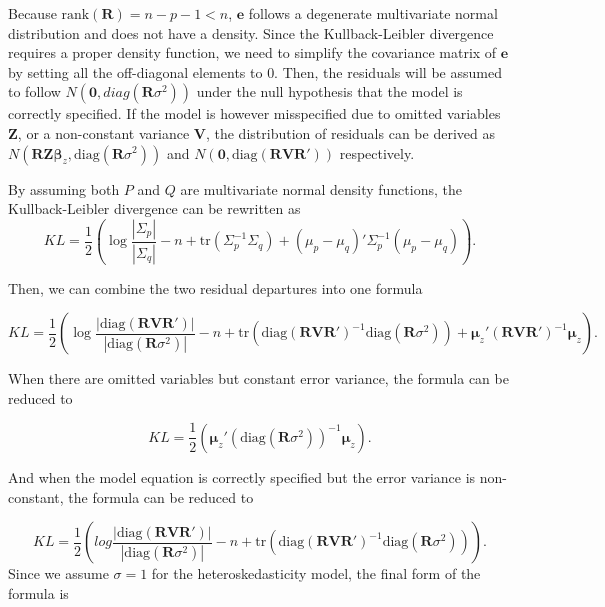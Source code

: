 \documentclass[]{interact}
\theoremstyle{plain}%
\theoremstyle{definition}
\theoremstyle{remark}
\begin{document}
Because \(\text{rank}(\boldsymbol{R}) = n - p - 1 < n\),
\(\boldsymbol{e}\) follows a degenerate multivariate normal distribution
and does not have a density. Since the Kullback-Leibler divergence
requires a proper density function, we need to simplify the covariance
matrix of \(\boldsymbol{e}\) by setting all the off-diagonal elements to
0. Then, the residuals will be assumed to follow
\(N(\boldsymbol{0}, diag(\boldsymbol{R}\sigma^2))\) under the null
hypothesis that the model is correctly specified. If the model is
however misspecified due to omitted variables \(\boldsymbol{Z}\), or a
non-constant variance \(\boldsymbol{V}\), the distribution of residuals
can be derived as
\(N(\boldsymbol{R}\boldsymbol{Z}\boldsymbol{\beta}_z, \text{diag}(\boldsymbol{R}\sigma^2))\)
and
\(N(\boldsymbol{0}, \text{diag}(\boldsymbol{R}\boldsymbol{V}\boldsymbol{R}'))\)
respectively.

By assuming both \(P\) and \(Q\) are multivariate normal density
functions, the Kullback-Leibler divergence can be rewritten as
\[KL = \frac{1}{2}\left(\log\frac{|\Sigma_p|}{|\Sigma_q|} - n + \text{tr}(\Sigma_p^{-1}\Sigma_q) + (\mu_p - \mu_q)'\Sigma_p^{-1}(\mu_p - \mu_q)\right).\]

Then, we can combine the two residual departures into one formula

\small

\begin{equation*}
\label{eq:effect-size}
KL = \frac{1}{2}\left(\log\frac{|\text{diag}(\boldsymbol{R}\boldsymbol{V}\boldsymbol{R}')|}{|\text{diag}(\boldsymbol{R}\sigma^2)|} - n + \text{tr}(\text{diag}(\boldsymbol{R}\boldsymbol{V}\boldsymbol{R}')^{-1}\text{diag}(\boldsymbol{R}\sigma^2)) + \boldsymbol{\mu}_z'(\boldsymbol{R}\boldsymbol{V}\boldsymbol{R}')^{-1}\boldsymbol{\mu}_z\right).
\end{equation*}

\normalsize

When there are omitted variables but constant error variance, the
formula can be reduced to

\[KL = \frac{1}{2}\left(\boldsymbol{\mu}_z'(\text{diag}(\boldsymbol{R}\sigma^2))^{-1}\boldsymbol{\mu}_z\right).\]

And when the model equation is correctly specified but the error
variance is non-constant, the formula can be reduced to

\[KL = \frac{1}{2}\left(log\frac{|\text{diag}(\boldsymbol{R}\boldsymbol{V}\boldsymbol{R}')|}{|\text{diag}(\boldsymbol{R}\sigma^2)|} - n + \text{tr}(\text{diag}(\boldsymbol{R}\boldsymbol{V}\boldsymbol{R}')^{-1}
\text{diag}(\boldsymbol{R}\sigma^2))\right).\] Since we assume
\(\sigma = 1\) for the heteroskedasticity model, the final form of the
formula is
\end{document}
